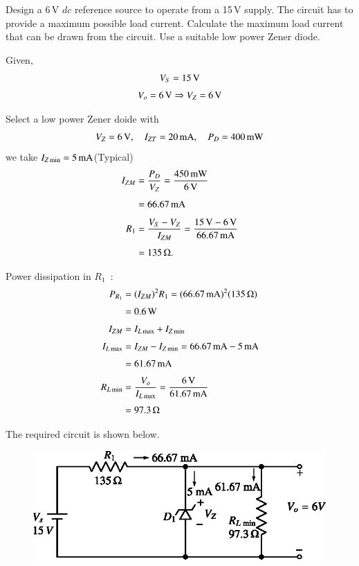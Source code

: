\begin{example}\label{exam2.28}
Design a 6\,V $dc$ reference source to operate from a 15\,V supply. The circuit has to provide a maximum possible load current. Calculate the maximum load current that can be drawn from the circuit. Use a suitable low power Zener diode.
\end{example}

\begin{solution}
Given,
\begin{gather*}
V_{S}=15\text{\,V}\\[3pt]
V_{o}=6\text{\,V}\Rightarrow V_{Z}=6\text{\,V}
\end{gather*}

Select a low power Zener doide with
$$
V_{Z}=6\text{\,V},\quad I_{ZT}=20\text{\,mA},\quad P_{D}=400\text{\,mW}
$$
we take $I_{Z\min}=5\text{\,mA}$\quad (Typical)
\begin{align*}
I_{ZM} &= \frac{P_{D}}{V_{Z}}=\frac{450\text{\,mW}}{6\text{\,V}}\\[4pt]
&= 66.67\text{\,mA}\\[4pt]
R_{1} &= \frac{V_{S}-V_{Z}}{I_{ZM}}=\frac{15\text{\,V}-6\text{\,V}}{66.67\text{\,mA}}\\[4pt]
&= 135\,\Omega.
\end{align*}

\eject

Power dissipation in $R_{1}$~:
\begin{align*}
P_{R_{1}} &= (I_{ZM})^{2}R_{1}=(66.67\text{\,mA})^{2}(135\,\Omega)\\[3pt]
&= 0.6\text{\,W}\\[3pt]
I_{ZM} &= I_{L\max}+I_{Z\min}\\[3pt]
I_{L\max} &= I_{ZM}-I_{Z\min}=66.67\text{\,mA}-5\text{\,mA}\\[3pt]
&= 61.67\text{\,mA}\\[3pt]
R_{L\min} &= \frac{V_{o}}{I_{L\max}}=\frac{6\text{\,V}}{61.67\text{\,mA}}\\[3pt]
&= 97.3\,\Omega
\end{align*}

The required circuit is shown below.
\begin{figure}[H]
\centering
\includegraphics{chap2/sol2.26a.eps}
\end{figure}
\vskip -1cm
\end{solution}

